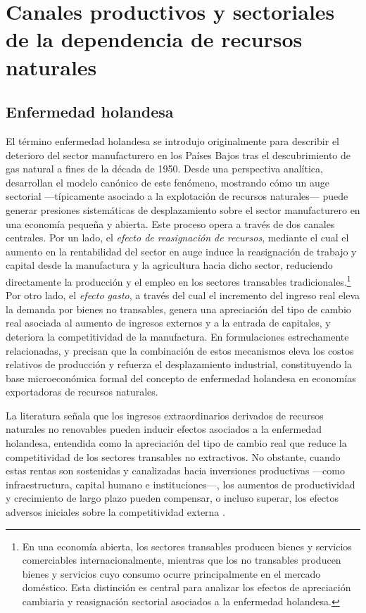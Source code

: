 \documentclass[../../PTFM.tex]{subfiles}
\begin{document}
	\section{Canales productivos y sectoriales de la dependencia de recursos naturales}
	\label{sec:canales-productivos}
	
	\subsection{Enfermedad holandesa}
	\label{subsec:enfermedad-holandesa}
	
	El término enfermedad holandesa se introdujo originalmente para describir el deterioro del sector manufacturero en los Países Bajos tras el descubrimiento de gas natural a fines de la década de 1950. Desde una perspectiva analítica, \textcite{Corden1982} desarrollan el modelo canónico de este fenómeno, mostrando cómo un auge sectorial —típicamente asociado a la explotación de recursos naturales— puede generar presiones sistemáticas de desplazamiento sobre el sector manufacturero en una economía pequeña y abierta. Este proceso opera a través de dos canales centrales. Por un lado, el \textit{efecto de reasignación de recursos}, mediante el cual el aumento en la rentabilidad del sector en auge induce la reasignación de trabajo y capital desde la manufactura y la agricultura hacia dicho sector, reduciendo directamente la producción y el empleo en los sectores transables tradicionales.\footnote{En una economía abierta, los sectores transables producen bienes y servicios comerciables internacionalmente, mientras que los no transables producen bienes y servicios cuyo consumo ocurre principalmente en el mercado doméstico. Esta distinción es central para analizar los efectos de apreciación cambiaria y reasignación sectorial asociados a la enfermedad holandesa.} Por otro lado, el \textit{efecto gasto}, a través del cual el incremento del ingreso real eleva la demanda por bienes no transables, genera una apreciación del tipo de cambio real asociada al aumento de ingresos externos y a la entrada de capitales, y deteriora la competitividad de la manufactura. En formulaciones estrechamente relacionadas, \textcite{Corden1984} y \textcite{Neary1985} precisan que la combinación de estos mecanismos eleva los costos relativos de producción y refuerza el desplazamiento industrial, constituyendo la base microeconómica formal del concepto de enfermedad holandesa en economías exportadoras de recursos naturales.
	
	La literatura señala que los ingresos extraordinarios derivados de recursos naturales no renovables pueden inducir efectos asociados a la enfermedad holandesa, entendida como la apreciación del tipo de cambio real que reduce la competitividad de los sectores transables no extractivos. No obstante, cuando estas rentas son sostenidas y canalizadas hacia inversiones productivas —como infraestructura, capital humano e instituciones—, los aumentos de productividad y crecimiento de largo plazo pueden compensar, o incluso superar, los efectos adversos iniciales sobre la competitividad externa \parencite{Barder2006}.
	
\end{document}
